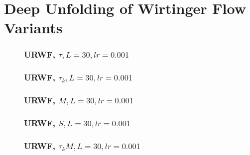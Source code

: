 \documentclass{beamer}
\theoremstyle{definition}
\theoremstyle{remark}
\begin{document}
\section[DU/AU of WF*]{Deep Unfolding of Wirtinger Flow Variants}
\begin{frame}
  \begin{figure}
    \frametitle{URWF, $\tau,L=30,lr=0.001$}
    \centering
    \resizebox{0.9\textwidth}{!}{}
    \label{fig:rwf_s_00_l_30_lr_0.001}
  \end{figure}
\end{frame}
\begin{frame}
  \begin{figure}
    \frametitle{URWF, $\tau_k,L=30,lr=0.001$}
    \centering
    \resizebox{0.9\textwidth}{!}{}
    \label{fig:rwf_s_01_l_30_lr_0.001}
  \end{figure}
\end{frame}
\begin{frame}
  \begin{figure}
    \frametitle{URWF, $M,L=30,lr=0.001$}
    \centering
    \resizebox{0.9\textwidth}{!}{}
    \label{fig:rwf_s_02_l_30_lr_0.001}
  \end{figure}
\end{frame}
\begin{frame}
  \begin{figure}
    \frametitle{URWF, $S,L=30,lr=0.001$}
    \centering
    \resizebox{0.9\textwidth}{!}{}
    \label{fig:rwf_s_03_l_30_lr_0.001}
  \end{figure}
\end{frame}
\begin{frame}
  \begin{figure}
    \frametitle{URWF, $\tau_{k}M,L=30,lr=0.001$}
    \centering
    \resizebox{0.9\textwidth}{!}{}
    \label{fig:rwf_s_04_l_30_lr_0.001}
  \end{figure}
\end{frame}
\end{document}
